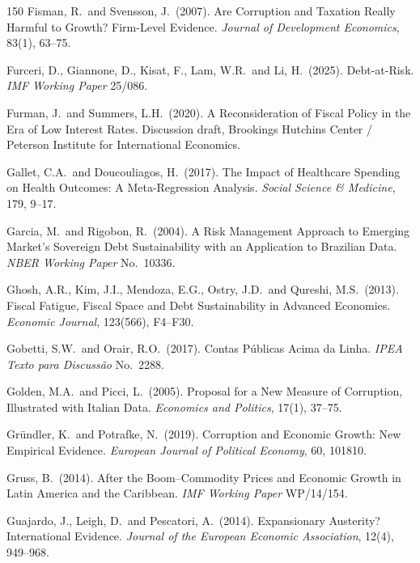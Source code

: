 \documentclass[11pt,a4paper]{article}
\begin{document}
\begin{thebibliography}{150}
 Fisman, R.\ and Svensson, J.\ (2007). Are Corruption and Taxation Really Harmful to Growth? Firm-Level Evidence. \textit{Journal of Development Economics}, 83(1), 63--75.

 Furceri, D., Giannone, D., Kisat, F., Lam, W.R.\ and Li, H.\ (2025). Debt-at-Risk. \textit{IMF Working Paper} 25/086.

 Furman, J.\ and Summers, L.H.\ (2020). A Reconsideration of Fiscal Policy in the Era of Low Interest Rates. Discussion draft, Brookings Hutchins Center / Peterson Institute for International Economics.

 Gallet, C.A.\ and Doucouliagos, H.\ (2017). The Impact of Healthcare Spending on Health Outcomes: A Meta-Regression Analysis. \textit{Social Science \& Medicine}, 179, 9--17.

 Garcia, M.\ and Rigobon, R.\ (2004). A Risk Management Approach to Emerging Market's Sovereign Debt Sustainability with an Application to Brazilian Data. \textit{NBER Working Paper} No.\ 10336.

 Ghosh, A.R., Kim, J.I., Mendoza, E.G., Ostry, J.D.\ and Qureshi, M.S.\ (2013). Fiscal Fatigue, Fiscal Space and Debt Sustainability in Advanced Economies. \textit{Economic Journal}, 123(566), F4--F30.

 Gobetti, S.W.\ and Orair, R.O.\ (2017). Contas P\'ublicas Acima da Linha. \textit{IPEA Texto para Discuss\~ao} No.\ 2288.

 Golden, M.A.\ and Picci, L.\ (2005). Proposal for a New Measure of Corruption, Illustrated with Italian Data. \textit{Economics and Politics}, 17(1), 37--75.

 Gr\"undler, K.\ and Potrafke, N.\ (2019). Corruption and Economic Growth: New Empirical Evidence. \textit{European Journal of Political Economy}, 60, 101810.

 Gruss, B.\ (2014). After the Boom--Commodity Prices and Economic Growth in Latin America and the Caribbean. \textit{IMF Working Paper} WP/14/154.

 Guajardo, J., Leigh, D.\ and Pescatori, A.\ (2014). Expansionary Austerity? International Evidence. \textit{Journal of the European Economic Association}, 12(4), 949--968.


\end{thebibliography}
\end{document}
